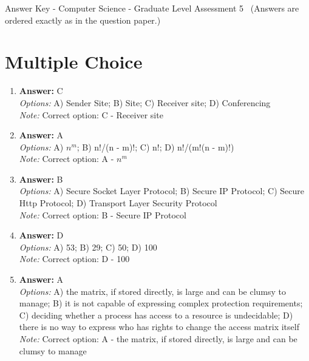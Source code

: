 \documentclass[12pt]{article}
\begin{document}
\begin{center}
Answer Key - Computer Science - Graduate Level Assessment 5 \
\small (Answers are ordered exactly as in the question paper.)
\end{center}

\section*{Multiple Choice}
\begin{enumerate}[label=\arabic*.]
\item \textbf{Answer:} C
\\ \textit{Options:} A) Sender Site; B) Site; C) Receiver site; D) Conferencing
\\ \textit{Note:} Correct option: C - Receiver site
\item \textbf{Answer:} A
\\ \textit{Options:} A) $n^m$; B) n!/(n - m)!; C) n!; D) n!/(m!(n - m)!)
\\ \textit{Note:} Correct option: A - $n^m$
\item \textbf{Answer:} B
\\ \textit{Options:} A) Secure Socket Layer Protocol; B) Secure IP Protocol; C) Secure Http Protocol; D) Transport Layer Security Protocol
\\ \textit{Note:} Correct option: B - Secure IP Protocol
\item \textbf{Answer:} D
\\ \textit{Options:} A) 53; B) 29; C) 50; D) 100
\\ \textit{Note:} Correct option: D - 100
\item \textbf{Answer:} A
\\ \textit{Options:} A) the matrix, if stored directly, is large and can be clumsy to manage; B) it is not capable of expressing complex protection requirements; C) deciding whether a process has access to a resource is undecidable; D) there is no way to express who has rights to change the access matrix itself
\\ \textit{Note:} Correct option: A - the matrix, if stored directly, is large and can be clumsy to manage
\end{enumerate}
\end{document}
